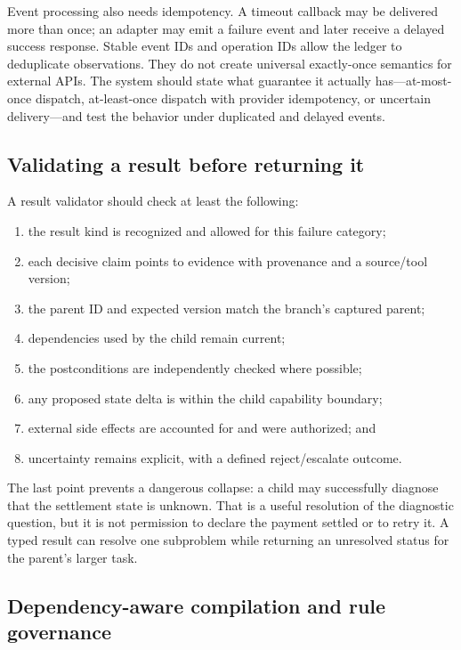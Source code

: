 Event processing also needs idempotency. A timeout callback may be delivered more than once; an adapter may emit a failure event and later receive a delayed success response. Stable event IDs and operation IDs allow the ledger to deduplicate observations. They do not create universal exactly-once semantics for external APIs. The system should state what guarantee it actually has—at-most-once dispatch, at-least-once dispatch with provider idempotency, or uncertain delivery—and test the behavior under duplicated and delayed events.

\subsection{Validating a result before returning it}
\label{subsec:ch13-result-validation}

A result validator should check at least the following:

\begin{enumerate}
  \item the result kind is recognized and allowed for this failure category;
  \item each decisive claim points to evidence with provenance and a source/tool version;
  \item the parent ID and expected version match the branch's captured parent;
  \item dependencies used by the child remain current;
  \item the postconditions are independently checked where possible;
  \item any proposed state delta is within the child capability boundary;
  \item external side effects are accounted for and were authorized; and
  \item uncertainty remains explicit, with a defined reject/escalate outcome.
\end{enumerate}

The last point prevents a dangerous collapse: a child may successfully diagnose that the settlement state is unknown. That is a useful resolution of the diagnostic question, but it is not permission to declare the payment settled or to retry it. A typed result can resolve one subproblem while returning an unresolved status for the parent's larger task.

\subsection{Dependency-aware compilation and rule governance}
\label{subsec:ch13-rule-compiler}

